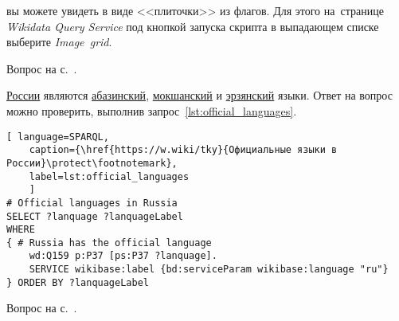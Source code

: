 \begin{task}
	
 вы можете увидеть в виде <<плиточки>> из флагов. 
Для этого на~странице \emph{Wikidata Query Service} под кнопкой запуска скрипта 
в выпадающем списке выберите  \emph{Image~grid}.
	
\small{Вопрос на с.~\pageref{lst:without_inception}.}
\end{task}



\begin{task}
\label{answer:official_language}
 \href{https://w.wiki/myt}{России} являются 
    \href{https://w.wiki/myv}{абазинский}, 
    \href{https://w.wiki/myx}{мокшанский} 
    и \href{https://w.wiki/myy}{эрзянский} языки. 
    Ответ на вопрос можно проверить, выполнив запрос~\ref{lst:official_languages}.
	
	\begin{lstlisting}[ language=SPARQL, 
	caption={\href{https://w.wiki/tky}{Официальные языки в России}\protect\footnotemark},
	label=lst:official_languages
	]
# Official languages in Russia
SELECT ?lanquage ?lanquageLabel
WHERE
{ # Russia has the official language
	wd:Q159 p:P37 [ps:P37 ?lanquage].
	SERVICE wikibase:label {bd:serviceParam wikibase:language "ru"}
} ORDER BY ?lanquageLabel
\end{lstlisting}
	
\small{Вопрос на с.~\pageref{lst:List_of_historical_countries}.}
\end{task}


